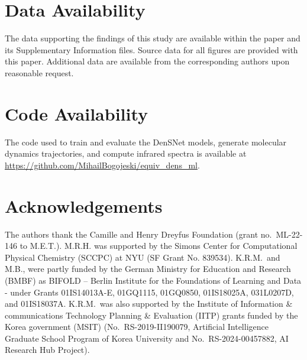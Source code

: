 \documentclass[12pt]{article}
\begin{document}
\section*{Data Availability}
The data supporting the findings of this study are available within the paper and its Supplementary Information files. Source data for all figures are provided with this paper. Additional data are available from the corresponding authors upon reasonable request.

\section*{Code Availability}
The code used to train and evaluate the DenSNet models, generate molecular dynamics trajectories, and compute infrared spectra is available at \url{https://github.com/MihailBogojeski/equiv_dens_ml}.






\section*{Acknowledgements}
The authors thank the Camille and Henry Dreyfus Foundation (grant no.\ ML-22-146 to M.E.T.).
M.R.H.  was supported by the Simons Center for Computational Physical Chemistry (SCCPC) at NYU (SF Grant No. 839534).
K.R.M.\ and M.B., were partly funded by the German Ministry for Education and Research (BMBF) as BIFOLD – Berlin Institute for the Foundations of Learning and Data - under Grants 01IS14013A-E, 01GQ1115, 01GQ0850, 01IS18025A, 031L0207D, and 01IS18037A.   
K.R.M.\ was also supported by the Institute of Information \& communications Technology Planning \& Evaluation (IITP) grants funded by the Korea government (MSIT) (No.\ RS-2019-II190079, Artificial Intelligence Graduate School Program of Korea University and No.\ RS-2024-00457882, AI Research Hub Project).
\end{document}
